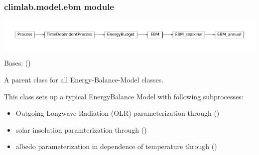 \documentclass[a4paper,10pt,english]{sphinxmanual}
\begin{document}
\subsubsection{climlab.model.ebm module}
\label{api/climlab.model:climlab-model-ebm-module}
\includegraphics{inheritance-6f4ff43846d3dd82bca0c822ba5c6598e2c24b73.pdf}
\label{api/climlab.model:module-climlab.model.ebm}

\begin{fulllineitems}
\label{api/climlab.model:climlab.model.ebm.EBM}
Bases: {\hyperref[api/climlab.process:climlab.process.energy_budget.EnergyBudget]{\emph{}}} ()

A parent class for all Energy-Balance-Model classes.

This class sets up a typical EnergyBalance Model with following subprocesses:
\begin{itemize}
\item {} 
Outgoing Longwave Radiation (OLR) parameterization through 
{\hyperref[api/climlab.radiation:climlab.radiation.AplusBT.AplusBT]{\emph{}}} ()

\item {} 
solar insolation paramterization through 
{\hyperref[api/climlab.radiation:climlab.radiation.insolation.P2Insolation]{\emph{}}} ()

\item {} 
albedo parameterization in dependence of temperature through
{\hyperref[api/climlab.surface:climlab.surface.albedo.StepFunctionAlbedo]{\emph{}}} ()


\end{itemize}
\end{fulllineitems}
\end{document}

